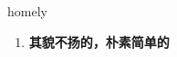 
\begin{frame}
{\huge homely}
\begin{center}
\begin{enumerate}\Large
  \item \textbf{其貌不扬的，朴素简单的}
\end{enumerate}
\end{center}
\end{frame}
